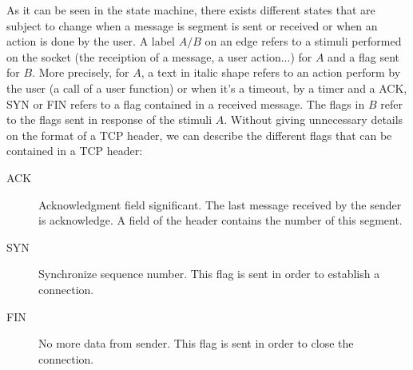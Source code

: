 \documentclass[a4paper, 10pt]{article}
\begin{document}
    As it can be seen in the state machine, there exists different states that are
    subject to change when a message is segment is sent or received or when an action
    is done by the user. A label $A/B$ on an edge refers to a stimuli performed on the socket
    (the receiption of a message, a user action...) for $A$ and a flag sent for $B$.
    More precisely, for $A$, a text in italic shape refers to an action perform by
    the user (a call of a user function) or when it's a timeout, by a timer and a ACK,
    SYN or FIN refers to a flag contained in a received message. The flags in $B$ refer
    to the flags sent in response of the stimuli $A$.  Without giving
    unnecessary details on the format of a TCP header, we can describe the different
    flags that can be contained in a TCP header:
    \begin{description}
        \item[ACK] Acknowledgment field significant. The last message received by the sender
        is acknowledge. A field of the header contains the number of this segment.
        \item[SYN] Synchronize sequence number. This flag is sent in order to establish
        a connection.
        \item[FIN] No more data from sender. This flag is sent in order to close the
        connection.
    \end{description}
    
\end{document}
